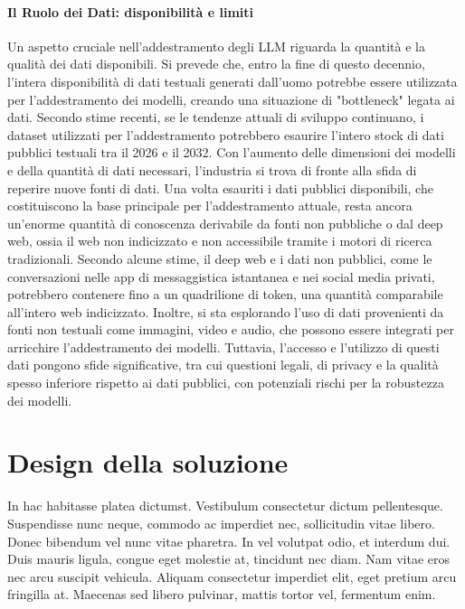 \documentclass[target=mst,aauheader=,style=]{thud}
\begin{document}
\subsubsection{Il Ruolo dei Dati: disponibilità e limiti}
Un aspetto cruciale nell'addestramento degli LLM riguarda la quantità e la qualità dei dati disponibili. Si prevede che, entro la fine di questo decennio, l’intera disponibilità di dati testuali generati dall’uomo potrebbe essere utilizzata per l'addestramento dei modelli, creando una situazione di "bottleneck" legata ai dati. Secondo stime recenti, se le tendenze attuali di sviluppo continuano, i dataset utilizzati per l’addestramento potrebbero esaurire l'intero stock di dati pubblici testuali tra il 2026 e il 2032.
Con l'aumento delle dimensioni dei modelli e della quantità di dati necessari, l’industria si trova di fronte alla sfida di reperire nuove fonti di dati. Una volta esauriti i dati pubblici disponibili, che costituiscono la base principale per l'addestramento attuale, resta ancora un'enorme quantità di conoscenza derivabile da fonti non pubbliche o dal deep web, ossia il web non indicizzato e non accessibile tramite i motori di ricerca tradizionali. Secondo alcune stime, il deep web e i dati non pubblici, come le conversazioni nelle app di messaggistica istantanea e nei social media privati, potrebbero contenere fino a un quadrilione di token, una quantità comparabile all'intero web indicizzato. Inoltre, si sta esplorando l'uso di dati provenienti da fonti non testuali come immagini, video e audio, che possono essere integrati per arricchire l'addestramento dei modelli. Tuttavia, l’accesso e l’utilizzo di questi dati pongono sfide significative, tra cui questioni legali, di privacy e la qualità spesso inferiore rispetto ai dati pubblici, con potenziali rischi per la robustezza dei modelli.


\chapter{Design della soluzione}
In hac habitasse platea dictumst. Vestibulum consectetur dictum pellentesque. Suspendisse nunc neque, commodo ac imperdiet nec, sollicitudin vitae libero. Donec bibendum vel nunc vitae pharetra. In vel volutpat odio, et interdum dui. Duis mauris ligula, congue eget molestie at, tincidunt nec diam. Nam vitae eros nec arcu suscipit vehicula. Aliquam consectetur imperdiet elit, eget pretium arcu fringilla at. Maecenas sed libero pulvinar, mattis tortor vel, fermentum enim.
\end{document}
